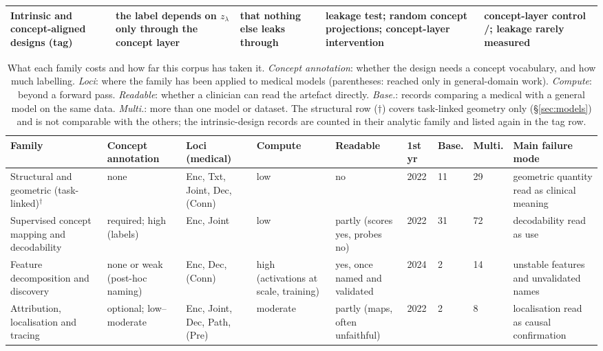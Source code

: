 \begin{table}[!tb]
\begin{tabular}{@{}L{2.3cm}L{3.4cm}L{2.8cm}L{3.25cm}L{3.25cm}@{}}
\midrule
\textbf{Intrinsic and concept-aligned designs} (tag) & the label depends on $z_\lambda$ only through the concept layer & that nothing else leaks through & leakage test; random concept projections; concept-layer intervention & concept-layer control \Vintrany{}/\Vintrn{}; leakage rarely measured \\
\bottomrule
\end{tabular}
\end{table}
\begin{table}[!tb]
\centering\footnotesize\setlength\tabcolsep{2.5pt}\renewcommand{\arraystretch}{1.05}
\caption{What each family costs and how far this corpus has taken it. \emph{Concept annotation}: whether
the design needs a concept vocabulary, and how much labelling. \emph{Loci}: where the family has been
applied to medical models (parentheses: reached only in general-domain work). \emph{Compute}: beyond a
forward pass. \emph{Readable}: whether a clinician can read the artefact directly. \emph{Base.}: records
comparing a medical with a general model on the same data. \emph{Multi.}: more than one model or dataset.
The structural row ($\dagger$) covers task-linked geometry only (\S\ref{sec:models}) and is not comparable
with the others; the \Nintrinsic{} intrinsic-design records are counted in their analytic family and
listed again in the tag row.}
\label{tab:famreq}
\begin{tabular}{@{}L{2.2cm}L{2.1cm}L{2.0cm}L{1.6cm}L{1.8cm}C{0.7cm}C{0.8cm}C{0.8cm}L{2.8cm}@{}}
\toprule
Family & Concept annotation & Loci (medical) & Compute & Readable & 1st yr & Base. & Multi. & Main failure mode \\
\midrule
Structural and geometric (task-linked)$^{\dagger}$ & none & Enc, Txt, Joint, Dec, (Conn) & low & no & 2022 & 11 & 29 & geometric quantity read as clinical meaning \\
Supervised concept mapping and decodability & required; high (labels) & Enc, Joint & low & partly (scores yes, probes no) & 2022 & 31 & 72 & decodability read as use \\
Feature decomposition and discovery & none or weak (post-hoc naming) & Enc, Dec, (Conn) & high (activations at scale, training) & yes, once named and validated & 2024 & 2 & 14 & unstable features and unvalidated names \\
Attribution, localisation and tracing & optional; low--moderate & Enc, Joint, Dec, Path, (Pre) & moderate & partly (maps, often unfaithful) & 2022 & 2 & 8 & localisation read as causal confirmation \\

\end{tabular}
\end{table}
